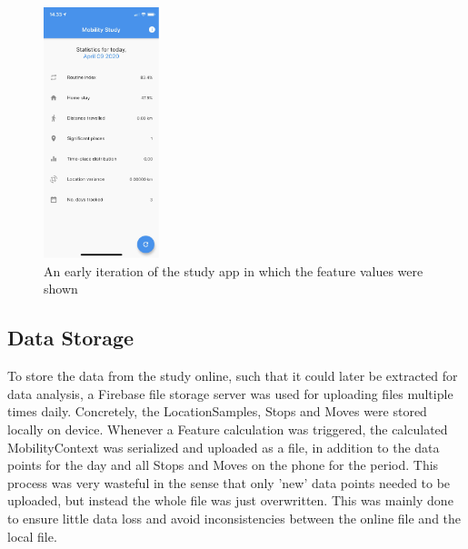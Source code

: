 \begin{figure}
    \centering
    \includegraphics[width=0.3\textwidth]{images/app_imgs/screens-features.pdf}
    \caption{An early iteration of the study app in which the feature values were shown}
    \label{fig:app-features-screen}
\end{figure}
\subsection{Data Storage}
To store the data from the study online, such that it could later be extracted for data analysis, a Firebase file storage server was used for uploading files multiple times daily. Concretely, the LocationSamples, Stops and Moves were stored locally on device. Whenever a Feature calculation was triggered, the calculated MobilityContext was serialized and uploaded as a file, in addition to the data points for the day and all Stops and Moves on the phone for the period. This process was very wasteful in the sense that only 'new' data points needed to be uploaded, but instead the whole file was just overwritten. This was mainly done to ensure little data loss and avoid inconsistencies between the online file and the local file.